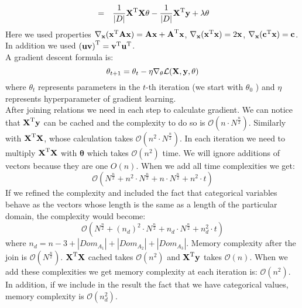 \documentclass[10pt,a4paper]{article}
\begin{document}
\begin{enumerate}
\begin{eqnarray}
&=& \frac{1}{|D|}\textbf{\text{{X}}} ^ \text{T}\textbf{\text{{X}}}\mathbf{\theta} - \frac{1}{|D|}\textbf{\text{{X}}} ^ \text{T}\textbf{\text{{y}}} + \lambda \mathbf{\theta}\nonumber
\end{eqnarray}
Here we used properties $\nabla_{\textbf{\text{{\textbf{\text{{x}}}}}}}(\textbf{\text{{x}}} ^ \text{T}\textbf{\text{{A}}}\textbf{\text{{x}}})=\textbf{\text{{A}}}\textbf{\text{{x}}} + \textbf{\text{{A}}} ^ \text{T}\textbf{\text{{x}}}$, $\nabla_{\textbf{\text{{\textbf{\text{{x}}}}}}}(\textbf{\text{{x}}} ^ \text{T}\textbf{\text{{x}}})=2\textbf{\text{{x}}}$, $\nabla_{\textbf{\text{{\textbf{\text{{x}}}}}}}(\textbf{\text{{c}}} ^ \text{T} \textbf{\text{{x}}}) = \textbf{\text{{c}}}$. In addition we used $\left(\textbf{\text{{u}}} \textbf{\text{{v}}}\right) ^ \text{T} = \textbf{\text{{v}}} ^ \text{T}\textbf{\text{{u}}} ^ \text{T}$. \\
A gradient descent formula is:
$$\mathbf{\theta}_{t+1}=\mathbf{\theta}_t - \eta\nabla_{\mathbf{\theta}} \mathcal{L}(\textbf{\text{{X}}},\textbf{\text{{y}}}, \mathbf{\theta})$$
where $\theta_t$ represents parameters in the $t$-th iteration (we start with $\theta_0$ ) and $\eta$ represents hyperparameter of gradient learning.  
\\
After joining relations we need in each step to calculate gradient. 
We can notice that $\textbf{\text{{X}}} ^ \text{T}\textbf{\text{{y}}}$ can be cached and the complexity to do so is $\mathcal{O}(n \cdot N^\frac{n}{2})$. Similarly with $\textbf{\text{{X}}} ^ \text{T}\textbf{\text{{X}}}$, whose calculation takes $\mathcal{O}(n^2 \cdot N^\frac{n}{2})$. In each iteration we need to multiply $\textbf{\text{{X}}} ^ \text{T}\textbf{\text{{X}}}$ with $\mathbf{\theta}$ which takes $\mathcal{O}(n^2)$ time. We will ignore additions of vectors because they are one $O(n)$.   
When we add  all time complexities we get:
$$\mathcal{O}(N^\frac{n}{2} + n^2 \cdot N^\frac{n}{2} + n \cdot  N^\frac{n}{2} + n^2 \cdot t) $$
If we refined the complexity and included the fact that categorical variables behave as the vectors whose length is the same as a length of the particular domain, the complexity would become:
$$\mathcal{O}(N^\frac{n}{2} + (n_d)^2 \cdot N^\frac{n}{2} + n_d \cdot  N^\frac{n}{2} + n_d^2 \cdot t) $$
where $n_d= n - 3 +  |Dom_{A_1}|+|Dom_{A_2}| + |Dom_{A_3}|$.
Memory complexity after the join is
$\mathcal{O}(N^\frac{n}{2})$. $\textbf{\text{{X}}} ^ \text{T}\textbf{\text{{X}}}$ cached takes $\mathcal{O}(n^2)$ and $\textbf{\text{{X}}} ^ \text{T}\textbf{\text{{y}}}$ takes $\mathcal{O}(n)$.
When we add these complexities we get memory complexity at each iteration is:
$\mathcal{O}(n^2)$. In addition, if we include in the result the fact that we have categorical values, memory complexity is $\mathcal{O}(n_d^2)$. 


\end{enumerate}
\end{document}
